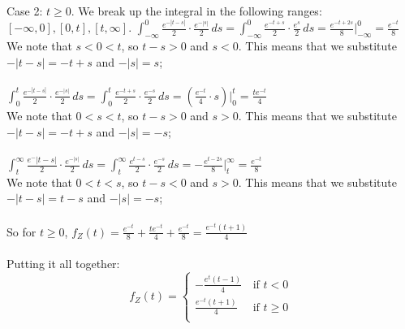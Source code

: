 \documentclass{article}
\begin{document}
{\\ \\ 
Case 2: $t \geq 0$. We break up the integral in the following ranges: $[-\infty, 0], [0, t], [t, \infty].$
$\int_{-\infty}^{0} \frac{e^{-|t-s|}}{2} \cdot \frac{e^{-|s|}}{2} \,ds = \int_{-\infty}^{0} \frac{e^{-t+s}}{2} \cdot \frac{e^{s}}{2} \,ds = \frac{e^{-t + 2s}}{8} |_{-\infty}^{0} = \frac{e^{-t}}{8}$ \\ 
We note that $s < 0 < t$, so $t - s > 0$ and $s < 0$. This means that we substitute $-|t-s| = -t+s$ and $-|s| = s$;  \\ \\ 
$\int_{0}^{t} \frac{e^{-|t-s|}}{2} \cdot \frac{e^{-|s|}}{2} \,ds = \int_{0}^{t} \frac{e^{-t+s}}{2} \cdot \frac{e^{-s}}{2} \,ds = (\frac{e^{-t}}{4} \cdot s) |_{0}^{t} = \frac{te^{-t}}{4}$ \\ 
We note that $0 < s < t$, so $t - s > 0$ and $s > 0$. This means that we substitute $-|t-s| = -t + s$ and $-|s| = -s$;  \\ \\
$\int_{t}^{\infty} \frac{e^-{|t-s|}}{2} \cdot \frac{e^{-|s|}}{2} \,ds = \int_{t}^{\infty} \frac{e^{t-s}}{2} \cdot \frac{e^{-s}}{2} \,ds = -\frac{e^{t - 2s}}{8} |_{t}^{\infty} = \frac{e^{-t}}{8}$ \\ 
We note that $0 < t < s$, so $t - s < 0$ and $s > 0$. This means that we substitute $-|t-s| = t - s$ and $-|s| = -s$;  \\ \\
So for $t \geq 0$, $f_Z(t) = \frac{e^{-t}}{8} + \frac{te^{-t}}{4} + \frac{e^{-t}}{8} = \frac{e^{-t}(t+1)}{4}$ \\ \\ 
Putting it all together: \\ 
\[
f_{Z}\left(t\right)=\begin{cases}
-\frac{e^t(t - 1)}{4}& \,\mbox{if } t < 0\\
\frac{e^{-t}(t+1)}{4}& \,\mbox{if } t \geq 0\\
\end{cases}
\]

}
\end{document}
